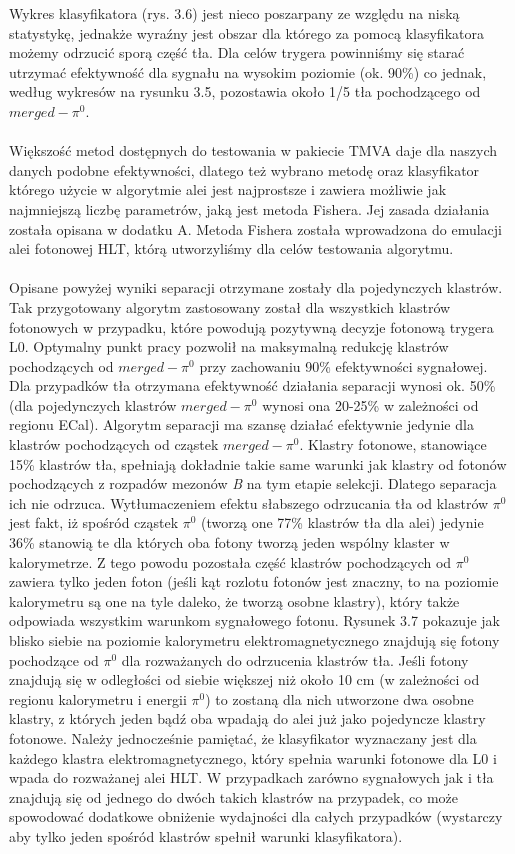 \documentclass{pracamgr}
\begin{document}
\noindent
Wykres klasyfikatora (rys. 3.6) jest nieco poszarpany ze względu na niską statystykę, jednakże wyraźny jest obszar dla którego za pomocą klasyfikatora możemy odrzucić sporą część tła. Dla celów trygera powinniśmy się starać utrzymać efektywność dla sygnału na wysokim poziomie (ok. 90\%) co jednak, według wykresów na rysunku 3.5, pozostawia około 1/5 tła pochodzącego od $merged-\pi^0$.
\\\\
\noindent
Większość metod dostępnych do testowania w pakiecie TMVA daje dla naszych danych podobne efektywności, dlatego też wybrano metodę oraz klasyfikator którego użycie w algorytmie alei jest najprostsze i zawiera możliwie jak najmniejszą liczbę parametrów, jaką jest metoda Fishera. Jej zasada działania została opisana w dodatku A. Metoda Fishera została wprowadzona do emulacji alei fotonowej HLT, którą utworzyliśmy dla celów testowania algorytmu.
\\\\
\noindent
Opisane powyżej wyniki separacji otrzymane zostały dla pojedynczych klastrów. Tak przygotowany algorytm zastosowany został dla wszystkich klastrów fotonowych w przypadku, które powodują pozytywną decyzje fotonową trygera L0. Optymalny punkt pracy pozwolił na maksymalną redukcję klastrów pochodzących od $merged-\pi^0$ przy zachowaniu 90\% efektywności sygnałowej. Dla przypadków tła otrzymana efektywność działania separacji wynosi ok. 50\% (dla pojedynczych klastrów $merged-\pi^0$ wynosi ona 20-25\% w zależności od regionu ECal). Algorytm separacji ma szansę działać efektywnie jedynie dla klastrów pochodzących od cząstek $merged-\pi^0$. Klastry fotonowe, stanowiące 15\% klastrów tła, spełniają dokładnie takie same warunki jak klastry od fotonów pochodzących z rozpadów mezonów \textit{B} na tym etapie selekcji. Dlatego separacja ich nie odrzuca. Wytłumaczeniem efektu słabszego odrzucania tła od klastrów $\pi^0$ jest fakt, iż spośród cząstek $\pi^0$ (tworzą one 77\% klastrów tła dla alei) jedynie 36\% stanowią te dla których oba fotony tworzą jeden wspólny klaster w kalorymetrze. Z tego powodu pozostała część klastrów pochodzących od $\pi^0$ zawiera tylko jeden foton (jeśli kąt rozlotu fotonów jest znaczny, to na poziomie kalorymetru są one na tyle daleko, że tworzą osobne klastry), który także odpowiada wszystkim warunkom sygnałowego fotonu. Rysunek 3.7 pokazuje jak blisko siebie na poziomie kalorymetru elektromagnetycznego znajdują się fotony pochodzące od $\pi^0$ dla rozważanych do odrzucenia klastrów tła. Jeśli fotony znajdują się w odległości od siebie większej niż około 10 cm (w zależności od regionu kalorymetru i energii $\pi^0$) to zostaną dla nich utworzone dwa osobne klastry, z których jeden bądź oba wpadają do alei już jako pojedyncze klastry fotonowe. Należy jednocześnie pamiętać, że klasyfikator wyznaczany jest dla każdego klastra elektromagnetycznego, który spełnia warunki fotonowe dla L0 i wpada do rozważanej alei HLT. W przypadkach zarówno sygnałowych jak i tła znajdują się od jednego do dwóch takich klastrów na przypadek, co może spowodować dodatkowe obniżenie wydajności dla całych przypadków (wystarczy aby tylko jeden spośród klastrów spełnił warunki klasyfikatora).
\end{document}

